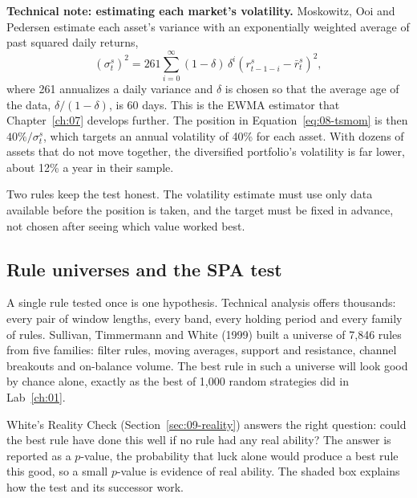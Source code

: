 \begin{technote}
\textbf{Technical note: estimating each market's volatility.} Moskowitz, Ooi and Pedersen estimate each asset's variance with an exponentially weighted average of past squared daily returns,
\begin{equation}
  \left(\sigma^s_t\right)^2 = 261 \sum_{i=0}^{\infty} (1-\delta)\,\delta^i \left(r^s_{t-1-i} - \bar r^s_t\right)^2,
  \label{eq:08-ewma}
\end{equation}
where 261 annualizes a daily variance and $\delta$ is chosen so that the average age of the data, $\delta/(1-\delta)$, is 60 days. This is the EWMA estimator that Chapter~\ref{ch:07} develops further. The position in Equation~\eqref{eq:08-tsmom} is then $40\%/\sigma^s_t$, which targets an annual volatility of 40\% for each asset. With dozens of assets that do not move together, the diversified portfolio's volatility is far lower, about 12\% a year in their sample.
\end{technote}

Two rules keep the test honest. The volatility estimate must use only data available before the position is taken, and the target must be fixed in advance, not chosen after seeing which value worked best.

\subsection{Rule universes and the SPA test}

A single rule tested once is one hypothesis. Technical analysis offers thousands: every pair of window lengths, every band, every holding period and every family of rules. Sullivan, Timmermann and White (1999) built a universe of 7,846 rules from five families: filter rules, moving averages, support and resistance, channel breakouts and on-balance volume. The best rule in such a universe will look good by chance alone, exactly as the best of 1,000 random strategies did in Lab~\ref{ch:01}.

White's Reality Check (Section~\ref{sec:09-reality}) answers the right question: could the best rule have done this well if no rule had any real ability? The answer is reported as a $p$-value, the probability that luck alone would produce a best rule this good, so a small $p$-value is evidence of real ability. The shaded box explains how the test and its successor work.

